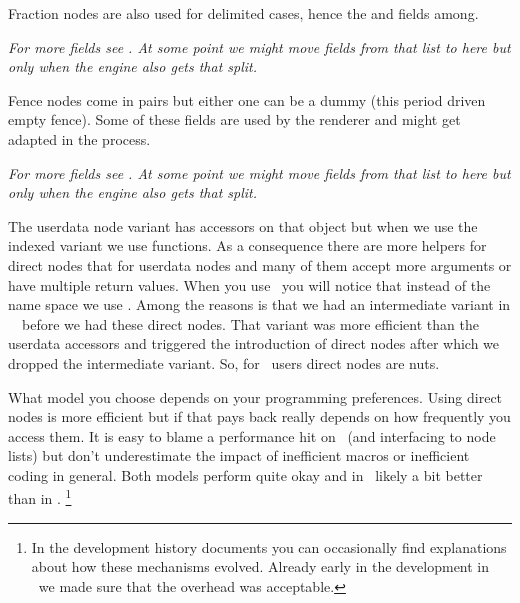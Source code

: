 
\stopsubsection

\startsubsection[title={fraction}]

Fraction nodes are also used for delimited cases, hence the  and
 fields among.


{\em For more fields see . At some point we might move fields from
that list to here but only when the engine also gets that split.}


\stopsubsection

\startsubsection[title={fence}]

Fence nodes come in pairs but either one can be a dummy (this period driven empty
fence). Some of these fields are used by the renderer and might get adapted in
the process.


{\em For more fields see . At some point we might move fields from
that list to here but only when the engine also gets that split.}


\stopsubsection

\stopsection

\startsection[title=Helpers]

\startsubsection[title={Introduction}]

The userdata node variant has accessors on that object but when we use the
indexed variant we use functions. As a consequence there are more helpers for
direct nodes that for userdata nodes and many of them accept more arguments or
have multiple return values. When you use \CONTEXT\ you will notice that instead
of the  name space we use . Among the reasons is
that we had an intermediate variant in \CONTEXT\ \MKIV\ before we had these
direct nodes. That variant was more efficient than the userdata accessors and
triggered the introduction of direct nodes after which we dropped the
intermediate variant. So, for \CONTEXT\ users direct nodes are nuts.

What model you choose depends on your programming preferences. Using direct nodes
is more efficient but if that pays back really depends on how frequently you
access them. It is easy to blame a performance hit on \LUA\ (and interfacing to
node lists) but don't underestimate the impact of inefficient macros or
inefficient coding in general. Both models perform quite okay and in \LUAMETATEX\
likely a bit better than in \LUATEX. \footnote {In the development history
documents you can occasionally find explanations about how these mechanisms
evolved. Already early in the development in \LUATEX\ we made sure that the
overhead was acceptable.}

